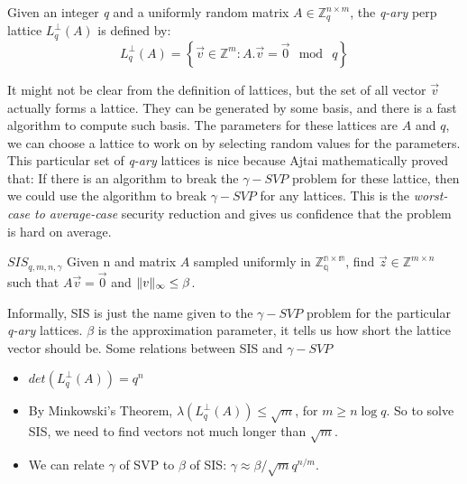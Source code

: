 \begin{definition}
  Given an integer \emph{q} and a uniformly random matrix
  $A \in \mathbb{Z}_{q}^{n \times m}$, the \emph{q-ary} perp lattice
  $L_q^\bot(A)$ is defined by:
  \[
    L_q^\bot(A) = \left\{ \vec{v} \in \mathbb{Z}^m : A.\vec{v} = \vec{0} \mod \
      q \right\}
  \]
\end{definition}
It might not be clear from the definition of lattices, but the set of all vector
$\vec{v}$ actually forms a lattice. They can be generated by some basis, and
there is a fast algorithm to compute such basis. The parameters for these
lattices are $A$ and $q$, we can choose a lattice to work on by selecting random
values for the parameters. This particular set of \emph{q-ary} lattices is nice
because Ajtai mathematically proved that: If there is an algorithm to break the
$\gamma-SVP$ problem for these lattice, then we could use the algorithm to break
$\gamma-SVP$ for any lattices. This is the \emph{worst-case to average-case}
security reduction and gives us confidence that the problem is hard on average.
\begin{definition}
  $SIS_{q,m,n,\gamma}$ Given n and matrix $A$ sampled uniformly in
  $\mathbb{Z_q^{n \times m}}$, find $\vec{z} \in \mathbb{Z}^{m \times n}$ such
  that $A\vec{v} = \vec{0}$ and $\Vert v \Vert_{\infty} \leq \beta$.
  \label{def:SISProblem}
\end{definition}
Informally, SIS is just the name given to the $\gamma-SVP$ problem for the
particular \emph{q-ary} lattices. $\beta$ is the approximation parameter, it
tells us how short the lattice vector should be. Some relations between SIS and
$\gamma-SVP$
\begin{itemize}
\item $det(L_q^\bot(A)) = q^n$
\item By Minkowski's Theorem, $\lambda(L_q^\bot(A)) \leq \sqrt{m}$, for
  $m \geq n \log q$. So to solve SIS, we need to find vectors not much longer
  than $\sqrt{m}$.
\item We can relate $\gamma$ of SVP to $\beta$ of SIS:
  $\gamma \approx \beta/\sqrt{m}q^{n/m}$.
\end{itemize}

